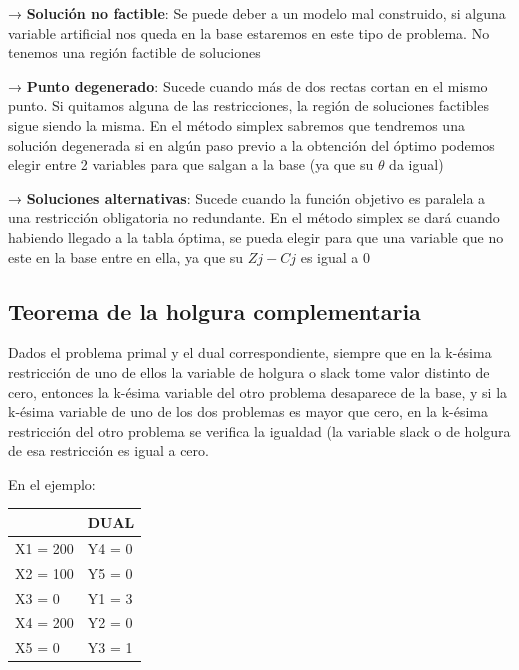 \documentclass[titlepage,a4paper]{article}
\begin{document}
→ \textbf{Solución no factible}: Se puede deber a un modelo mal construido, si alguna variable artificial nos queda en la base estaremos en este tipo de problema. No tenemos una región factible de soluciones

→ \textbf{Punto degenerado}: Sucede cuando más de dos rectas cortan en el mismo punto. Si quitamos alguna de las restricciones, la región de soluciones factibles sigue siendo la misma. En el método simplex sabremos que tendremos una solución degenerada si en algún paso previo a la obtención del óptimo podemos elegir entre 2 variables para que salgan a la base (ya que su $\theta$ da igual)

→ \textbf{Soluciones alternativas}: Sucede cuando la función objetivo es paralela a una restricción obligatoria no redundante. En el método simplex se dará cuando habiendo llegado a la tabla óptima, se pueda elegir para que una variable que no este en la base entre en ella, ya que su $Zj - Cj$ es igual a 0



\vspace{0.5cm}

\subsection{Teorema de la holgura complementaria}

Dados el problema primal y el dual correspondiente, siempre que en la k-ésima restricción de uno de ellos la variable de holgura o slack tome valor distinto de cero, entonces la k-ésima variable del otro problema desaparece de la base, y si la k-ésima variable de uno de los dos problemas es mayor que cero, en la k-ésima restricción del otro problema se verifica la igualdad (la variable slack o de holgura de esa restricción es igual a cero.

En el ejemplo:

\vspace{0.5cm}


\begin{tabular}{|l|l|}
\hline
\rowcolor[HTML]{EFEFEF} 
\multicolumn{1}{|c|}{\cellcolor[HTML]{EFEFEF}\textbf{PRIMAL}} & \multicolumn{1}{c|}{\cellcolor[HTML]{EFEFEF}\textbf{DUAL}}\\ \hline
X1 = 200 & Y4 = 0 \\ \hline
X2 = 100 & Y5 = 0 \\ \hline
X3 = 0   & Y1 = 3 \\ \hline
X4 = 200 & Y2 = 0 \\ \hline
X5 = 0   & Y3 = 1 \\ \hline                     
\end{tabular}
\end{document}
